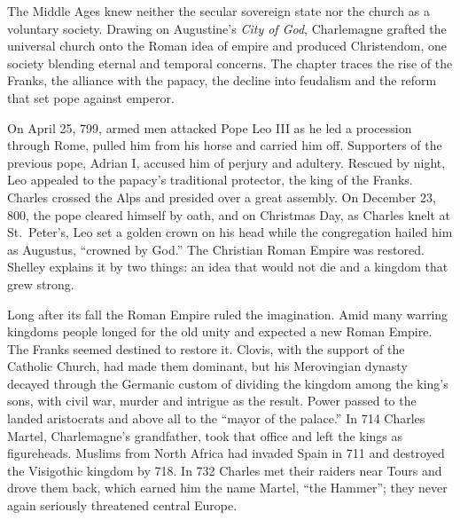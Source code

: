 
\begin{inbrief}
The Middle Ages knew neither the secular sovereign state nor the church as a voluntary society.
Drawing on Augustine's \emph{City of God}, Charlemagne grafted the universal church onto the Roman
idea of empire and produced Christendom, one society blending eternal and temporal concerns. The
chapter traces the rise of the Franks, the alliance with the papacy, the decline into feudalism and
the reform that set pope against emperor.
\end{inbrief}

On April 25, 799, armed men attacked Pope Leo III as he led a procession through Rome, pulled him from
his horse and carried him off. Supporters of the previous pope, Adrian I, accused him of perjury and
adultery. Rescued by night, Leo appealed to the papacy's traditional protector, the king of the
Franks. Charles crossed the Alps and presided over a great assembly. On December 23, 800, the pope
cleared himself by oath, and on Christmas Day, as Charles knelt at St.~Peter's, Leo set a golden crown
on his head while the congregation hailed him as Augustus, ``crowned by God.'' The Christian Roman
Empire was restored. Shelley explains it by two things: an idea that would not die and a kingdom that grew strong.

Long after its fall the Roman Empire ruled the imagination. Amid many warring kingdoms people longed
for the old unity and expected a new Roman Empire. The Franks seemed destined to restore it. Clovis,
with the support of the Catholic Church, had made them dominant, but his Merovingian dynasty decayed
through the Germanic custom of dividing the kingdom among the king's sons, with civil war, murder and
intrigue as the result. Power passed to the landed aristocrats and above all to the ``mayor of the
palace.'' In 714 Charles Martel, Charlemagne's grandfather, took that office and left the kings as
figureheads. Muslims from North Africa had invaded Spain in 711 and destroyed the Visigothic kingdom
by 718. In 732 Charles met their raiders near Tours and drove them back, which earned him the name
Martel, ``the Hammer''; they never again seriously threatened central Europe.

